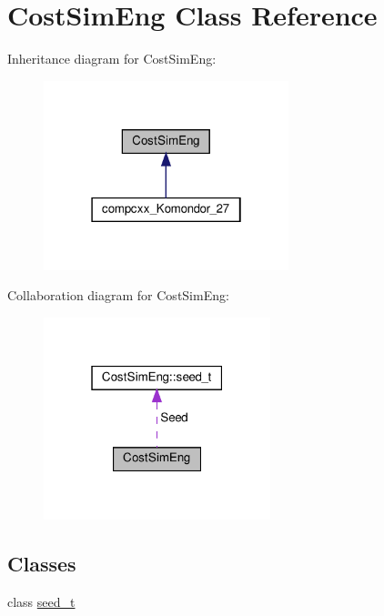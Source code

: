 \hypertarget{classCostSimEng}{}\section{Cost\+Sim\+Eng Class Reference}
\label{classCostSimEng}


Inheritance diagram for Cost\+Sim\+Eng\+:\nopagebreak
\begin{figure}[H]
\begin{center}
\leavevmode
\includegraphics[width=202pt]{classCostSimEng__inherit__graph}
\end{center}
\end{figure}


Collaboration diagram for Cost\+Sim\+Eng\+:\nopagebreak
\begin{figure}[H]
\begin{center}
\leavevmode
\includegraphics[width=187pt]{classCostSimEng__coll__graph}
\end{center}
\end{figure}
\subsection*{Classes}
\begin{DoxyCompactItemize}
\item 
class \hyperlink{classCostSimEng_1_1seed__t}{seed\+\_\+t}
\end{DoxyCompactItemize}
